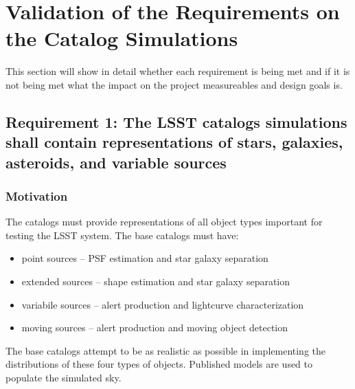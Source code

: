 \documentclass[]{article}
\begin{document}
\section{Validation of the Requirements on the Catalog Simulations}
This section will show in detail whether each requirement is being met and if it is not
being met what the impact on the project measureables and design goals is.


\subsection{Requirement 1: The LSST catalogs simulations shall contain representations of stars,
galaxies, asteroids, and variable sources}
\subsubsection{Motivation}
The catalogs must provide representations of all object types important for testing the LSST system.  The base catalogs must
have:
\begin{itemize}
\item point sources -- PSF estimation and star galaxy separation
\item extended sources -- shape estimation and star galaxy separation
\item variabile sources -- alert production and lightcurve characterization
\item moving sources -- alert production and moving object detection
\end{itemize}

The base catalogs attempt to be as realistic as possible in implementing the distributions of these four types of objects.
Published models are used to populate the simulated sky.
\end{document}
